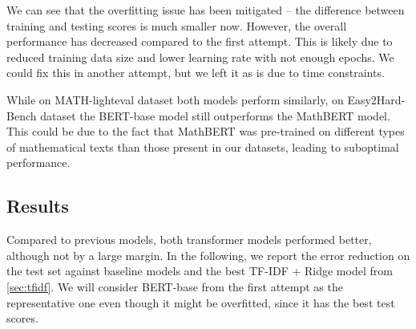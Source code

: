 \documentclass[runningheads]{llncs}
\begin{document}
\vspace{5pt}

We can see that the overfitting issue has been mitigated -- the difference between training and testing scores is much smaller now. However, the overall performance has decreased compared to the first attempt. This is likely due to reduced training data size and lower learning rate with not enough epochs. We could fix this in another attempt, but we left it as is due to time constraints.

While on MATH-lighteval dataset both models perform similarly, on Easy2Hard-Bench dataset the BERT-base model still outperforms the MathBERT model. This could be due to the fact that MathBERT was pre-trained on different types of mathematical texts than those present in our datasets, leading to suboptimal performance.

\subsection{Results}

Compared to previous models, both transformer models performed better, although not by a large margin. In the following, we report the error reduction on the test set against baseline models and the best TF-IDF + Ridge model from \cref{sec:tfidf}. We will consider BERT-base from the first attempt as the representative one even though it might be overfitted, since it has the best test scores.
\end{document}

